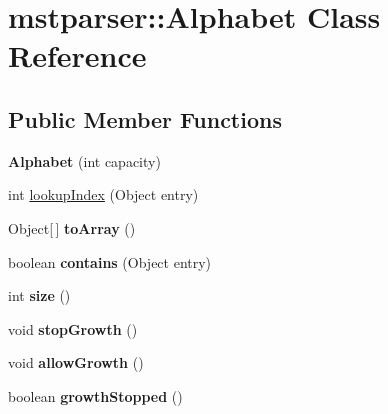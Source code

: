 \hypertarget{classmstparser_1_1Alphabet}{
\section{mstparser::Alphabet Class Reference}
\label{classmstparser_1_1Alphabet}
}
\subsection*{Public Member Functions}
\begin{DoxyCompactItemize}
\item 
\hypertarget{classmstparser_1_1Alphabet_a960e113dd6e8904988983ef503a284dd}{
{\bfseries Alphabet} (int capacity)}
\label{classmstparser_1_1Alphabet_a960e113dd6e8904988983ef503a284dd}

\item 
int \hyperlink{classmstparser_1_1Alphabet_a76971ecbacfad318bc7a9798effc6192}{lookupIndex} (Object entry)
\item 
\hypertarget{classmstparser_1_1Alphabet_a9d8582dbe61c1fa676074981537a9ed2}{
Object\mbox{[}$\,$\mbox{]} {\bfseries toArray} ()}
\label{classmstparser_1_1Alphabet_a9d8582dbe61c1fa676074981537a9ed2}

\item 
\hypertarget{classmstparser_1_1Alphabet_a22fc561a609a40c1c2cc745664ea21aa}{
boolean {\bfseries contains} (Object entry)}
\label{classmstparser_1_1Alphabet_a22fc561a609a40c1c2cc745664ea21aa}

\item 
\hypertarget{classmstparser_1_1Alphabet_a82a1082c5f7a05b8143314512922af36}{
int {\bfseries size} ()}
\label{classmstparser_1_1Alphabet_a82a1082c5f7a05b8143314512922af36}

\item 
\hypertarget{classmstparser_1_1Alphabet_a004ff1e60046fe34d0d58a369208b66a}{
void {\bfseries stopGrowth} ()}
\label{classmstparser_1_1Alphabet_a004ff1e60046fe34d0d58a369208b66a}

\item 
\hypertarget{classmstparser_1_1Alphabet_a4cfb6b31a1b15e8344ca65347dd11411}{
void {\bfseries allowGrowth} ()}
\label{classmstparser_1_1Alphabet_a4cfb6b31a1b15e8344ca65347dd11411}

\item 
\hypertarget{classmstparser_1_1Alphabet_a812b8d5a94f6158e79ed94563a74226b}{
boolean {\bfseries growthStopped} ()}
\label{classmstparser_1_1Alphabet_a812b8d5a94f6158e79ed94563a74226b}

\end{DoxyCompactItemize}
